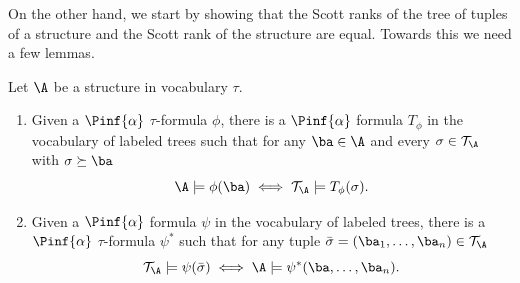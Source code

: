 \documentclass{amsart}
\newcommand{\T}{{\mathcal{T}}}
\begin{document}
On the other hand, we start by showing that the Scott ranks of the tree of tuples of a structure
and the Scott rank of the structure are equal. Towards this we need a few
lemmas.
\begin{lemma}\label{lemma:translation} 
   Let $\A$ be a structure in vocabulary $\tau$.
   \begin{enumerate}
      \tightlist
      \item\label{eq:pushforward} Given a $\Pinf{\alpha}$ $\tau$-formula $\phi$, there is a
         $\Pinf{\alpha}$ formula $T_\phi$ in the vocabulary of labeled trees
         such that for any $\ba\in \A$ and every $\sigma\in \T_\A$ with
         $\sigma\succeq \ba$ 
         \[\A\models\phi(\ba)\iff \T_\A\models T_\phi(\sigma).\]
      \item\label{eq:pullback} Given a $\Pinf{\alpha}$ formula $\psi$ in the
         vocabulary of labeled trees, there is a $\Pinf{\alpha}$ $\tau$-formula
         $\psi^*$ such that for any tuple $\bar{\sigma}=(\ba_1,\dots,\ba_n)\in
         \T_\A$ \[\T_\A\models \psi(\bar\sigma) \iff
         \A\models\psi^*(\ba,\dots,\ba_n).\]
      \end{enumerate}
\end{lemma} 
\end{document}
